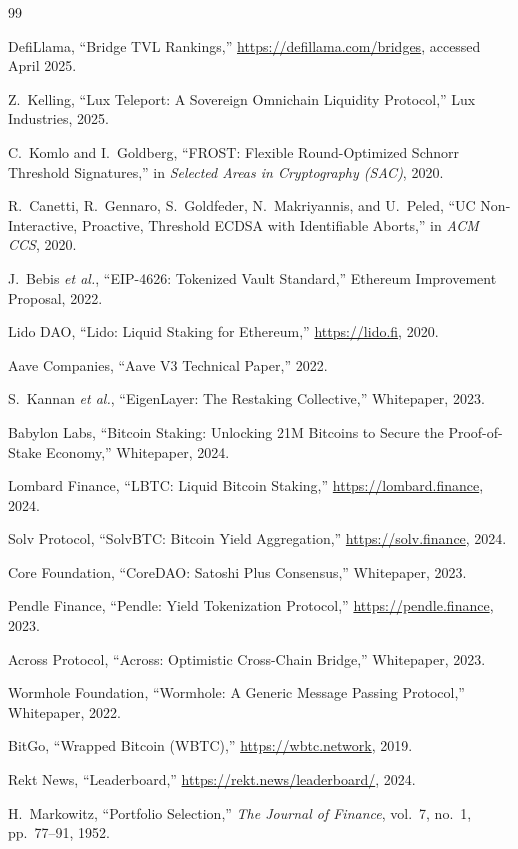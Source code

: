 \documentclass[11pt,twocolumn]{article}
\begin{document}
\begin{thebibliography}{99}

 DefiLlama, ``Bridge TVL Rankings,'' \url{https://defillama.com/bridges}, accessed April 2025.

 Z.~Kelling, ``Lux Teleport: A Sovereign Omnichain Liquidity Protocol,'' Lux Industries, 2025.

 C.~Komlo and I.~Goldberg, ``FROST: Flexible Round-Optimized Schnorr Threshold Signatures,'' in \emph{Selected Areas in Cryptography (SAC)}, 2020.

 R.~Canetti, R.~Gennaro, S.~Goldfeder, N.~Makriyannis, and U.~Peled, ``UC Non-Interactive, Proactive, Threshold ECDSA with Identifiable Aborts,'' in \emph{ACM CCS}, 2020.

 J.~Bebis \emph{et al.}, ``EIP-4626: Tokenized Vault Standard,'' Ethereum Improvement Proposal, 2022.

 Lido DAO, ``Lido: Liquid Staking for Ethereum,'' \url{https://lido.fi}, 2020.

 Aave Companies, ``Aave V3 Technical Paper,'' 2022.

 S.~Kannan \emph{et al.}, ``EigenLayer: The Restaking Collective,'' Whitepaper, 2023.

 Babylon Labs, ``Bitcoin Staking: Unlocking 21M Bitcoins to Secure the Proof-of-Stake Economy,'' Whitepaper, 2024.

 Lombard Finance, ``LBTC: Liquid Bitcoin Staking,'' \url{https://lombard.finance}, 2024.

 Solv Protocol, ``SolvBTC: Bitcoin Yield Aggregation,'' \url{https://solv.finance}, 2024.

 Core Foundation, ``CoreDAO: Satoshi Plus Consensus,'' Whitepaper, 2023.

 Pendle Finance, ``Pendle: Yield Tokenization Protocol,'' \url{https://pendle.finance}, 2023.

 Across Protocol, ``Across: Optimistic Cross-Chain Bridge,'' Whitepaper, 2023.

 Wormhole Foundation, ``Wormhole: A Generic Message Passing Protocol,'' Whitepaper, 2022.

 BitGo, ``Wrapped Bitcoin (WBTC),'' \url{https://wbtc.network}, 2019.

 Rekt News, ``Leaderboard,'' \url{https://rekt.news/leaderboard/}, 2024.

 H.~Markowitz, ``Portfolio Selection,'' \emph{The Journal of Finance}, vol.~7, no.~1, pp.~77--91, 1952.

\end{thebibliography}
\end{document}
